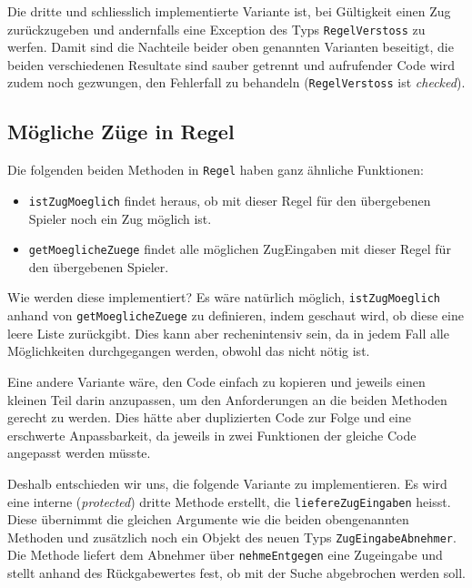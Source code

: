\documentclass[12pt,halfparskip]{scrartcl}
\begin{document}
Die dritte und schliesslich implementierte Variante ist, bei Gültigkeit einen Zug zurückzugeben und andernfalls eine Exception des Typs \texttt{RegelVerstoss} zu werfen. Damit sind die Nachteile beider oben genannten Varianten beseitigt, die beiden verschiedenen Resultate sind sauber getrennt und aufrufender Code wird zudem noch gezwungen, den Fehlerfall zu behandeln (\texttt{RegelVerstoss} ist \emph{checked}).

\subsection{Mögliche Züge in Regel}
\label{sub:moegliche_zuege_in_regel}

Die folgenden beiden Methoden in \texttt{Regel} haben ganz ähnliche Funktionen:

\begin{itemize}
	\item \texttt{istZugMoeglich} findet heraus, ob mit dieser Regel für den übergebenen Spieler noch ein Zug möglich ist.
	\item \texttt{getMoeglicheZuege} findet alle möglichen ZugEingaben mit dieser Regel für den übergebenen Spieler.
\end{itemize}

Wie werden diese implementiert? Es wäre natürlich möglich, \texttt{istZugMoeglich} anhand von \texttt{getMoeglicheZuege} zu definieren, indem geschaut wird, ob diese eine leere Liste zurückgibt. Dies kann aber rechenintensiv sein, da in jedem Fall alle Möglichkeiten durchgegangen werden, obwohl das nicht nötig ist.

Eine andere Variante wäre, den Code einfach zu kopieren und jeweils einen kleinen Teil darin anzupassen, um den Anforderungen an die beiden Methoden gerecht zu werden. Dies hätte aber duplizierten Code zur Folge und eine erschwerte Anpassbarkeit, da jeweils in zwei Funktionen der gleiche Code angepasst werden müsste.


Deshalb entschieden wir uns, die folgende Variante zu implementieren. Es wird eine interne (\emph{protected}) dritte Methode erstellt, die \texttt{liefereZugEingaben} heisst. Diese übernimmt die gleichen Argumente wie die beiden obengenannten Methoden und zusätzlich noch ein Objekt des neuen Typs \texttt{ZugEingabeAbnehmer}. Die Methode liefert dem Abnehmer über \texttt{nehmeEntgegen} eine Zugeingabe und stellt anhand des Rückgabewertes fest, ob mit der Suche abgebrochen werden soll.
\end{document}
